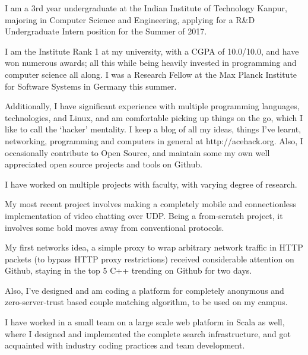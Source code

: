 \documentclass[11pt, a4paper]{awesome-cv} %
\begin{document}
\makecvheader %

\makelettertitle %


\begin{cvletter}


  I am a 3rd year undergraduate at the Indian Institute of Technology
  Kanpur, majoring in Computer Science and Engineering, applying for a
  R\&D Undergraduate Intern position for the Summer of 2017.

  I am the Institute Rank 1 at my university, with a CGPA of
  10.0/10.0, and have won numerous awards; all this while being
  heavily invested in programming and computer science all along. I
  was a Research Fellow at the Max Planck Institute for Software
  Systems in Germany this summer.

  Additionally, I have significant experience with multiple
  programming languages, technologies, and Linux, and am comfortable
  picking up things on the go, which I like to call the `hacker'
  mentality. I keep a blog of all my ideas, things I've learnt,
  networking, programming and computers in general at
  http://acehack.org. Also, I occasionally contribute to Open Source,
  and maintain some my own well appreciated open source projects and
  tools on Github.

  I have worked on multiple projects with faculty, with varying degree
  of research.

  My most recent project involves making a completely mobile and
  connectionless implementation of video chatting over UDP. Being a
  from-scratch project, it involves some bold moves away from
  conventional protocols.

  My first networks idea, a simple proxy to wrap arbitrary network
  traffic in HTTP packets (to bypass HTTP proxy restrictions) received
  considerable attention on Github, staying in the top 5 C++ trending
  on Github for two days.

  Also, I've designed and am coding a platform for completely
  anonymous and zero-server-trust based couple matching algorithm, to
  be used on my campus.

  I have worked in a small team on a large scale web platform in Scala
  as well, where I designed and implemented the complete search
  infrastructure, and got acquainted with industry coding practices
  and team development.


\end{cvletter}
\end{document}

